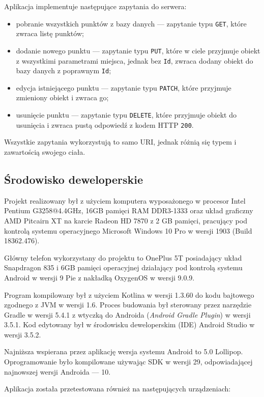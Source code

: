 \documentclass[polish,polish,a4paper,12pt]{article}
\begin{document}
	Aplikacja implementuje następujące zapytania do serwera:

	\begin{itemize}
		\item pobranie wszystkich punktów z bazy danych — zapytanie typu \texttt{GET}, które zwraca listę punktów;
		\item dodanie nowego punktu — zapytanie typu \texttt{PUT}, które w ciele przyjmuje obiekt z wszystkimi parametrami miejsca, jednak bez \texttt{Id}, zwraca dodany obiekt do bazy danych z poprawnym \texttt{Id};
		\item edycja istniejącego punktu — zapytanie typu \texttt{PATCH}, które przyjmuje zmieniony obiekt i zwraca go;
		\item usunięcie punktu — zapytanie typu \texttt{DELETE}, które przyjmuje obiekt do usunięcia i zwraca pustą odpowiedź z kodem HTTP \texttt{200}.
	\end{itemize}

	Wszystkie zapytania wykorzystują to samo URI, jednak różnią się typem i zawartością swojego ciała.

	\subsection{Środowisko deweloperskie}

	Projekt realizowany był z użyciem komputera wyposażonego w procesor Intel Pentium G3258@4.4GHz, 16GB pamięci RAM DDR3-1333 oraz układ graficzny AMD Pitcairn XT na karcie Radeon HD 7870 z 2 GB pamięci, pracujący pod kontrolą systemu operacyjnego Microsoft Windows 10 Pro w wersji 1903 (Build 18362.476).

	Główny telefon wykorzystany do projektu to OnePlus 5T posiadający układ Snapdragon 835 i 6GB pamięci operacyjnej działający pod kontrolą systemu Android w wersji 9 Pie z nakładką OxygenOS w wersji 9.0.9.

	Program kompilowany był z użyciem Kotlina w wersji 1.3.60 do kodu bajtowego zgodnego z JVM w wersji 1.6. Proces budowania był sterowany przez narzędzie Gradle w wersji 5.4.1 z wtyczką do Androida (\textit{Android Gradle Plugin}) w wersji 3.5.1. Kod edytowany był w środowisku deweloperskim (IDE) Android Studio w wersji 3.5.2.

	Najniższa wspierana przez aplikację wersja systemu Android to 5.0 Lollipop. Oprogramowanie było kompilowane używając SDK w wersji 29, odpowiadającej najnowszej wersji Androida — 10.

	Aplikacja została przetestowana również na następujących urządzeniach:
\end{document}
